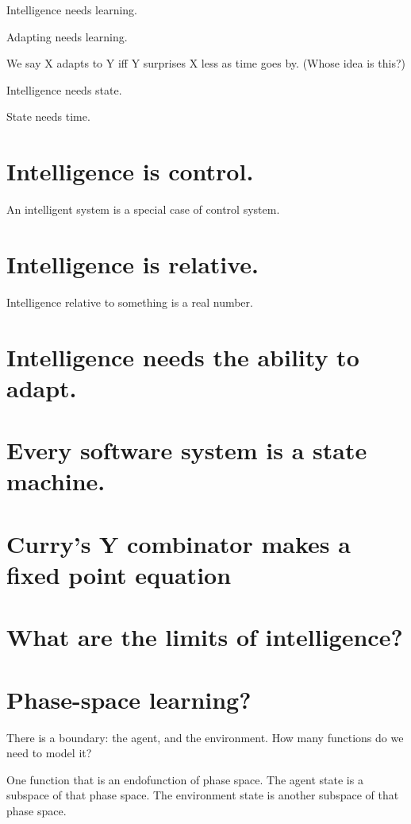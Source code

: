 Intelligence needs learning.

Adapting needs learning.

We say X adapts to Y iff Y surprises X less as time goes by. (Whose idea is this?)

Intelligence needs state.

State needs time.

\section{Intelligence is control.}

An intelligent system is a special case of control system.

\section{Intelligence is relative.}

Intelligence relative to something is a real number.

\section{Intelligence needs the ability to adapt.}

\section{Every software system is a state machine.}

\section{Curry's Y combinator makes a fixed point equation}

\section{What are the limits of intelligence?}

\section{Phase-space learning?}

There is a boundary: the agent, and the environment.
How many functions do we need to model it?

One function that is an endofunction of phase space.
The agent state is a subspace of that phase space.
The environment state is another subspace of that phase space.

